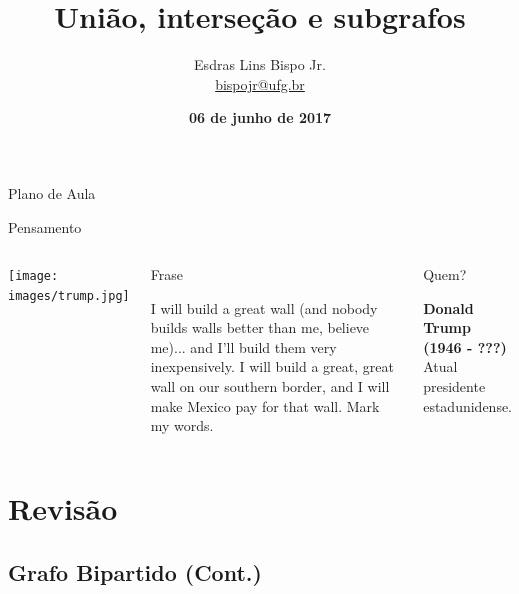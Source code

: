 \documentclass[xcolor=dvipsnames,table]{beamer}
\title{União, interseção e subgrafos}
\author{
  Esdras Lins Bispo Jr. \\ \url{bispojr@ufg.br}
  }
\institute{
  Teoria de Grafos \\Bacharelado em Ciência da Computação}
\date{\textbf{06 de junho de 2017} }
\begin{document}
	\begin{frame}
		\titlepage
	\end{frame}

	\AtBeginSection{
		\begin{frame}{Sumário}%
    		\tableofcontents[currentsection]
		\end{frame}
	}

	\begin{frame}{Plano de Aula}
		\tableofcontents
	\end{frame}
    
   \begin{frame}{Pensamento}
   	\begin{columns}
   		\begin{center}
   			\texttt{[image: images/trump.jpg]}
   		\end{center}
   		\begin{block}{Frase}
   			\begin{center}
   				{\large I will build a great wall (and nobody builds walls better than me, believe me)... and I’ll build them very inexpensively. I will build a great, great wall on our southern border, and I will make Mexico pay for that wall. Mark my words.}
   			\end{center}
   		\end{block}		  		
   		\begin{block}{Quem?}
   			\begin{center}
   				{\bf Donald Trump (1946 - ???)} \\Atual presidente estadunidense.
   			\end{center}
   		\end{block}
   	\end{columns}
   \end{frame}
    
    \section{Revisão}
	
	\subsection{Grafo Bipartido (Cont.)}
	
\end{document}
